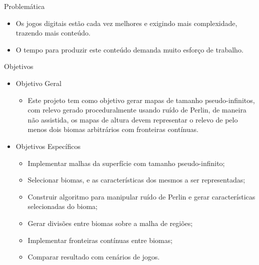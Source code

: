 



\begin{frame}{Problemática}
    \begin{itemize} \setlength\itemsep{1em}
        \item Os jogos digitais estão cada vez melhores e exigindo mais
        complexidade, trazendo mais conteúdo.
        \item O tempo para produzir este conteúdo demanda muito esforço de trabalho.
    \end{itemize}
\end{frame}


%    

\begin{frame}{Objetivos}
    \begin{itemize}
        \item Objetivo Geral
        \begin{itemize}
            \item Este projeto tem como objetivo gerar mapas de tamanho pseudo-infinitos, com 
            relevo gerado proceduralmente usando ruído 
            de Perlin, de maneira não assistida, os mapas de altura devem representar o 
            relevo de pelo menos dois biomas arbitrários com fronteiras contínuas.
        \end{itemize}
        \item Objetivos Específicos
        \begin{itemize}
            \item Implementar malhas da superfície com tamanho pseudo-infinito;
            \item Selecionar biomas, e as características dos mesmos a ser representadas;
            \item Construir algoritmo para manipular ruído de Perlin e gerar características
                selecionadas do bioma;
            \item Gerar divisões entre biomas sobre a malha de regiões;
            \item Implementar fronteiras contínuas entre biomas;
            \item Comparar resultado com cenários de jogos.
        \end{itemize}
    \end{itemize}
\end{frame}